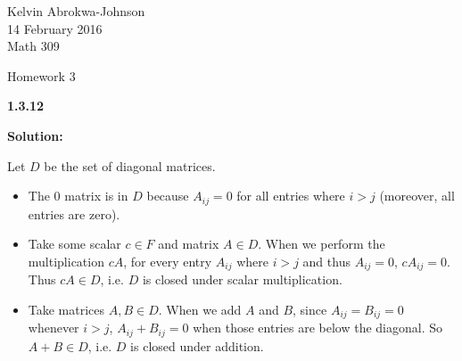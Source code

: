 \documentclass[11pt]{article} %
\begin{document}
 

Kelvin Abrokwa-Johnson \\
14 February 2016 \\
Math 309

\begin{center} Homework 3 \end{center}





{\bf 1.3.12}

\medskip
{\bf Solution:}

Let $D$ be the set of diagonal matrices.

\begin{itemize}

\item The $0$ matrix is in $D$ because $A_{ij} = 0$ for all entries where $i > j$ (moreover, all entries are zero).

\item Take some scalar $c \in F$ and matrix $A \in D$. When we perform the multiplication $cA$, for every entry $A_{ij}$ where $i > j$ and thus $A_{ij} = 0$, $cA_{ij} = 0$. Thus $cA \in D$, i.e. $D$ is closed under scalar multiplication.

\item Take matrices $A, B \in D$. When we add $A$ and $B$, since $A_{ij} = B_{ij} = 0$ whenever $i > j$, $A_{ij} + B_{ij} = 0$ when those entries are below the diagonal. So $A + B \in D$, i.e. $D$ is closed under addition.
\end{itemize}


\end{document}
